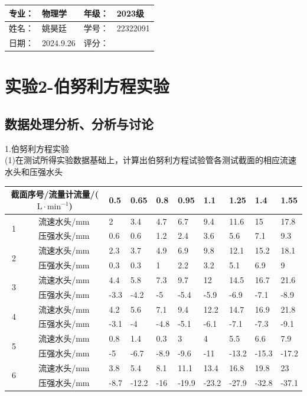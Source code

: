 \documentclass[dvipsnames, svgnames,a4paper,11pt]{article}
\begin{document}
\clearpage
{}
\begin{table}
	\renewcommand\arraystretch{1.7}
	\begin{tabularx}{\textwidth}{|X|X|X|X|}
	\hline
	专业：& 物理学 &年级：& 2023级\\
	\hline
	姓名： &姚昊廷 & 学号：& 22322091\\
	\hline
    日期：&2024.9.26 & 评分： &\\
	\hline
	\end{tabularx}
\end{table}

\section{实验2-伯努利方程实验}
\subsection{数据处理分析、分析与讨论}
1.伯努利方程实验\\
(1)在测试所得实验数据基础上，计算出伯努利方程试验管各测试截面的相应流速水头和压强水头
\begin{table}[!h]
	\renewcommand\arraystretch{1.7}
	\centering
	\begin{tabularx}{\textwidth}{|c|c|X|X|X|X|X|X|X|X|}
	\hline
	\multicolumn{2}{|c|}{截面序号/流量计流量/($\text{L}\cdot\text{min}^{-1}$)}& 0.5 & 0.65 & 0.8 & 0.95 & 1.1 & 1.25 & 1.4 & 1.55 \\ \hline
	\multirow{2}{*}{1}&流速水头/mm&2&3.4&4.7&6.7&9.4&11.6&15&17.8\\ \cline{2-10} 
	&压强水头/mm&0.6&0.6&1.2&2.4&3.6&5.6&7.1&9.3\\ \hline
	\multirow{2}{*}{2}&流速水头/mm&2.3&3.7&4.9&6.9&9.8&12.1&15.2&18.1\\  \cline{2-10}
	&压强水头/mm&0.3&0.3&1&2.2&3.2&5.1&6.9&9\\ \hline
	\multirow{2}{*}{3}&流速水头/mm&4.4&5.8&7.3&9.7&12&14.5&16.7&21.6\\  \cline{2-10}
	&压强水头/mm&-3.3&-4.2&-5&-5.4&-5.9&-6.9&-7.1&-8.9\\ \hline
	\multirow{2}{*}{4}&流速水头/mm&4.2&5.6&7.1&9.4&12.2&14.7&16.9&21.8\\  \cline{2-10}
	&压强水头/mm&-3.1&-4&-4.8&-5.1&-6.1&-7.1&-7.3&-9.1\\ \hline
	\multirow{2}{*}{5}&流速水头/mm&0.8&1.4&0.3&3&4&5.5&6.6&7.9\\  \cline{2-10}
	&压强水头/mm&-5&-6.7&-8.9&-9.6&-11&-13.2&-15.3&-17.2\\ \hline
	\multirow{2}{*}{6}&流速水头/mm&3.8&5.4&8.1&11.1&13.4&16.8&19.8&23\\  \cline{2-10}
	&压强水头/mm&-8.7&-12.2&-16&-19.9&-23.2&-27.9&-32.8&-37.1\\ \hline
	\end{tabularx}
\end{table}\par
\end{document}
